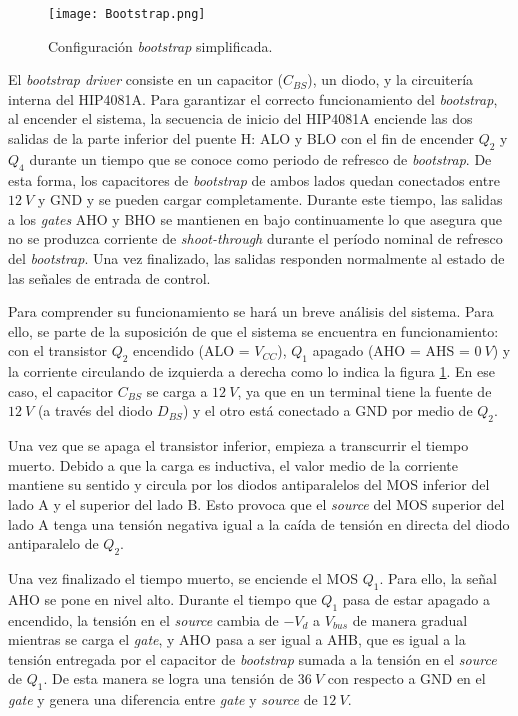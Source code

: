 \begin{figure}[H]
	\centering
	\texttt{[image: Bootstrap.png]}
	\caption{Configuración \textsl{bootstrap} simplificada.}
	\label{fig:img_bootstrap}
\end{figure}

\noindent El \textsl{bootstrap driver} consiste en un capacitor ($C_{BS}$), un diodo, y la circuitería interna del HIP4081A. Para garantizar el correcto funcionamiento del \textsl{bootstrap}, al encender el sistema, la secuencia de inicio del HIP4081A enciende las dos salidas de la parte inferior del puente H: ALO y BLO con el fin de encender $Q_2$ y $Q_4$ durante un tiempo que se conoce como periodo de refresco de \textsl{bootstrap}. De esta forma, los capacitores de \textsl{bootstrap} de ambos lados quedan conectados entre $12\:V$ y GND y se pueden cargar completamente. Durante este tiempo, las salidas a los \textsl{gates} AHO y BHO se mantienen en bajo continuamente lo que asegura que no se produzca corriente de \textsl{shoot-through} durante el período nominal de refresco del \textsl{bootstrap}. Una vez finalizado, las salidas responden normalmente al estado de las señales de entrada de control.

\noindent Para comprender su funcionamiento se hará un breve análisis del sistema. Para ello, se parte de la suposición de que el sistema se encuentra en funcionamiento: con el transistor $Q_2$ encendido (ALO = $V_{CC}$), $Q_1$ apagado (AHO = AHS = $0\:V$) y la corriente circulando de izquierda a derecha como lo indica la figura \ref{fig:img_bootstrap}. En ese caso, el capacitor $C_{BS}$ se carga a $12\:V$, ya que en un terminal tiene la fuente de $12\:V$ (a través del diodo $D_{BS}$) y el otro está conectado a GND por medio de $Q_2$.

\noindent Una vez que se apaga el transistor inferior, empieza a transcurrir el tiempo muerto. Debido a que la carga es inductiva, el valor medio de la corriente mantiene su sentido y circula por los diodos antiparalelos del MOS inferior del lado A y el superior del lado B. Esto provoca que el \textsl{source} del MOS superior del lado A tenga una tensión negativa igual a la caída de tensión en directa del diodo antiparalelo de $Q_2$. 

\noindent Una vez finalizado el tiempo muerto, se enciende el MOS $Q_1$. Para ello, la señal AHO se pone en nivel alto. Durante el tiempo que $Q_1$ pasa de estar apagado a encendido, la tensión en el \textsl{source} cambia de $-V_d$ a $V_{bus}$ de manera gradual mientras se carga el \textsl{gate}, y AHO pasa a ser igual a AHB, que es igual a la tensión entregada por el capacitor de \textsl{bootstrap} sumada a la tensión en el \textsl{source} de $Q_1$. De esta manera se logra una tensión de $36\:V$ con respecto a GND en el \textsl{gate} y genera una diferencia entre \textsl{gate} y \textsl{source} de $12\:V$.

